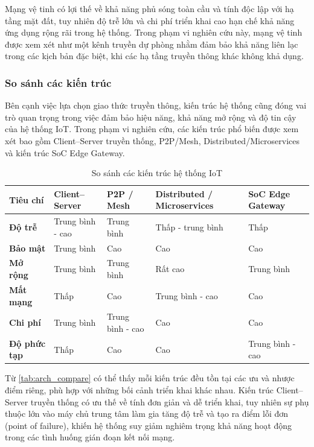 Mạng vệ tinh có lợi thế về khả năng phủ sóng toàn cầu và tính độc lập với hạ tầng
mặt đất, tuy nhiên độ trễ lớn và chi phí triển khai cao hạn chế khả năng ứng dụng
rộng rãi trong hệ thống. Trong phạm vi nghiên cứu này, mạng vệ tinh được xem xét
như một kênh truyền dự phòng nhằm đảm bảo khả năng liên lạc trong các kịch bản đặc
biệt, khi các hạ tầng truyền thông khác không khả dụng.

\subsubsection{So sánh các kiến trúc}

Bên cạnh việc lựa chọn giao thức truyền thông, kiến trúc hệ thống cũng đóng vai
trò quan trọng trong việc đảm bảo hiệu năng, khả năng mở rộng và độ tin cậy của
hệ thống IoT. Trong phạm vi nghiên cứu, các kiến trúc phổ biến được xem xét bao
gồm Client--Server truyền thống, P2P/Mesh, Distributed/Microservices và kiến trúc
SoC Edge Gateway.

\begin{table}[H]
\centering
\begin{tabularx}{\textwidth}{|p{2.2cm}|X|X|X|X|}
\hline
\textbf{Tiêu chí} & \textbf{Client--Server} & \textbf{P2P / Mesh} & \textbf{Distributed / Microservices} & \textbf{SoC Edge Gateway} \\
\hline

\textbf{Độ trễ} 
& Trung bình - cao
& Trung bình
& Thấp - trung bình
& Thấp \\
\hline

\textbf{Bảo mật} 
& Trung bình 
& Cao 
& Cao 
& Cao \\
\hline

\textbf{Mở rộng} 
& Trung bình 
& Trung bình 
& Rất cao 
& Trung bình \\
\hline

\textbf{Mất mạng} 
& Thấp 
& Cao 
& Trung bình - cao 
& Cao \\
\hline

\textbf{Chi phí} 
& Trung bình 
& Trung bình - cao 
& Cao 
& Cao \\
\hline

\textbf{Độ phức tạp} 
& Thấp 
& Cao 
& Cao 
& Trung bình - cao \\
\hline
\end{tabularx}
\caption{So sánh các kiến trúc hệ thống IoT}
\label{tab:arch_compare}
\end{table}


Từ \autoref{tab:arch_compare} có thể thấy mỗi kiến trúc đều tồn tại các ưu và nhược
điểm riêng, phù hợp với những bối cảnh triển khai khác nhau. Kiến trúc
Client--Server truyền thống có ưu thế về tính đơn giản và dễ triển khai, tuy nhiên
sự phụ thuộc lớn vào máy chủ trung tâm làm gia tăng độ trễ và tạo ra điểm lỗi đơn
(point of failure), khiến hệ thống suy giảm nghiêm trọng khả năng hoạt động trong
các tình huống gián đoạn kết nối mạng.

